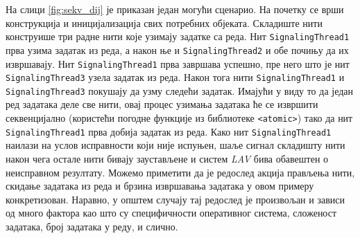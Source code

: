 \documentclass[12pt,oneside]{memoir}
\begin{document}
 На слици \ref{fig:sekv_dij}  је приказан један могући сценарио. На почетку се врши конструкција и иницијализација свих потребних објеката. Складиште нити конструише три радне нити које узимају задатке са реда. Нит \texttt{SignalingThread1} прва узима задатак из реда, а након ње и \texttt{SignalingThread2} и обе почињу да их извршавају. Нит \texttt{SignalingThread1} прва завршава успешно, пре него што је нит \texttt{SignalingThread3} узела задатак из реда. Након тога нити  \texttt{SignalingThread1} и  \texttt{SignalingThread3} покушају да узму следећи задатак. Имајући у виду то да један ред задатака деле све нити, овај процес узимања задатака ће се извршити секвенцијално (користећи погодне функције из библиотеке  \texttt{<atomic>}) тако да нит \texttt{SignalingThread1} прва добија задатак из реда. Како нит  \texttt{SignalingThread1} наилази на услов исправности који није испуњен, шаље сигнал складишту нити након чега остале нити бивају заустављене и систем \textit{LAV} бива обавештен о неисправном резултату. Можемо приметити да је редослед акција прављења нити, скидање задатака из реда и брзина извршавања задатака у овом примеру конкретизован. Наравно, у општем случају тај редослед је произвољан и зависи од много фактора као што су специфичности оперативног система, сложеност задатака, број задатака у реду, и слично.  
\end{document}

